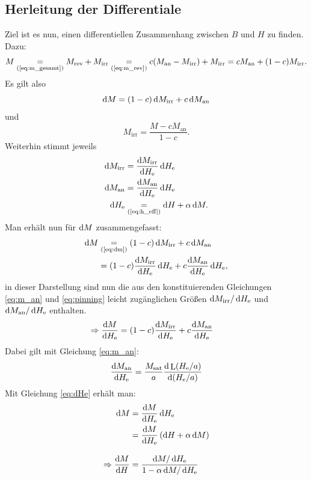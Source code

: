 \documentclass{scrartcl}
\DeclareMathOperator{\Langevin}{L}
\newcommand{\He}{H_\text{e}}
\newcommand{\Man}{M_\text{an}}
\newcommand{\Msat}{M_\text{sat}}
\newcommand{\Mirr}{M_\text{irr}}
\newcommand{\Mrev}{M_\text{rev}}
\newcommand{\textref}[1]{\text{(\ref{#1})}}
\newcommand{\eqr}[1]{\underset{\textref{#1}}{=}}
\begin{document}
\subsection{Herleitung der Differentiale}
Ziel ist es nun, einen differentiellen Zusammenhang zwischen $B$ und $H$ zu finden. Dazu:
\begin{equation}
	M \underset{\textref{eq:m_gesamt}}{=} \Mrev + \Mirr \underset{\textref{eq:m_rev}}{=} c (\Man - \Mirr) + \Mirr = c\Man + (1-c)\Mirr.
\end{equation}
Es gilt also
\begin{equation}
	\dif M = (1-c) \dif\Mirr + c\dif \Man \label{eq:dm}
\end{equation}
und 
\begin{equation}
	\Mirr = \frac{M - c\Man}{1 - c}.
\end{equation}
Weiterhin stimmt jeweils
\begin{align}
	\dif \Mirr &= \frac{\dif \Mirr}{\dif \He}\dif \He \\
	\dif \Man &= \frac{\dif \Man}{\dif \He}\dif \He\\
	\dif \He & \underset{\textref{eq:h_eff}}{=} \dif H + \alpha \dif M. \label{eq:dHe}
\end{align}
Man erhält nun für $\mathop{}\!\mathrm{d} M$ zusammengefasst:
\begin{align}
	\begin{split}
		\dif M &\eqr{eq:dm} (1-c) \dif\Mirr + c\dif \Man \\
				&= (1-c) \frac{\dif \Mirr}{\dif \He}\dif \He + c \frac{\dif \Man}{\dif \He}\dif \He,
	\end{split}
\end{align}
in dieser Darstellung sind nun die aus den konstituierenden Gleichungen \ref{eq:m_an} und \ref{eq:pinning} leicht zugänglichen Größen $\dif \Mirr/\dif \He$ und $\dif \Man/\dif \He$ enthalten.
\begin{align}
	\Rightarrow \frac{\dif M}{\dif \He} &= (1-c) \frac{\dif \Mirr}{\dif \He} + c \frac{\dif \Man}{\dif \He} \label{eq:dm_dhe}
\end{align}
Dabei gilt mit Gleichung \ref{eq:m_an}:
\begin{equation}
	\frac{\dif \Man}{\dif \He} = \frac{\Msat}{a} \frac{\dif \Langevin(\He/a)}{\dif(\He/a)}
\end{equation}
Mit Gleichung \ref{eq:dHe} erhält man:
\begin{equation}
	\begin{aligned}
		\dif M &= \frac{\dif M}{\dif \He}\dif \He \\
		&= \frac{\dif M}{\dif \He}\left(\dif H + \alpha \dif M\right) \\[0.3cm]
		\Rightarrow  \frac{\dif M}{\dif H} &= \frac{\dif M/\dif \He}{1 - \alpha \dif M/\dif \He}
	\end{aligned}
\end{equation}
\end{document}
